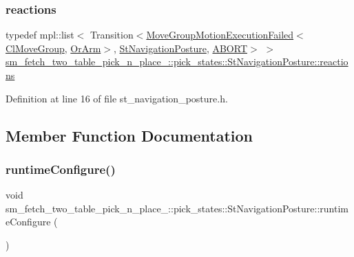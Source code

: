 \subsubsection{\texorpdfstring{reactions}{reactions}}
{\footnotesize\ttfamily typedef mpl\+::list$<$ Transition$<$\hyperlink{structmove__group__interface__client_1_1MoveGroupMotionExecutionFailed}{Move\+Group\+Motion\+Execution\+Failed}$<$\hyperlink{classmove__group__interface__client_1_1ClMoveGroup}{Cl\+Move\+Group}, \hyperlink{classsm__fetch__two__table__pick__n__place__1_1_1OrArm}{Or\+Arm}$>$, \hyperlink{structsm__fetch__two__table__pick__n__place__1_1_1pick__states_1_1StNavigationPosture}{St\+Navigation\+Posture}, \hyperlink{classABORT}{A\+B\+O\+RT}$>$ $>$ \hyperlink{structsm__fetch__two__table__pick__n__place__1_1_1pick__states_1_1StNavigationPosture_a1ed2aca740ca1806a83b8cb8cf0e80ea}{sm\+\_\+fetch\+\_\+two\+\_\+table\+\_\+pick\+\_\+n\+\_\+place\+\_\+::pick\+\_\+states\+::\+St\+Navigation\+Posture\+::reactions}}



Definition at line 16 of file st\+\_\+navigation\+\_\+posture.\+h.



\subsection{Member Function Documentation}
\mbox{\label{structsm__fetch__two__table__pick__n__place__1_1_1pick__states_1_1StNavigationPosture_a518a39cd5d1a0c7c8fefac7a62a98e82}} 
\subsubsection{\texorpdfstring{runtime\+Configure()}{runtimeConfigure()}}
{\footnotesize\ttfamily void sm\+\_\+fetch\+\_\+two\+\_\+table\+\_\+pick\+\_\+n\+\_\+place\+\_\+::pick\+\_\+states\+::\+St\+Navigation\+Posture\+::runtime\+Configure (\begin{DoxyParamCaption}{ }\end{DoxyParamCaption})\hspace{0.3cm}{\ttfamily [inline]}}



